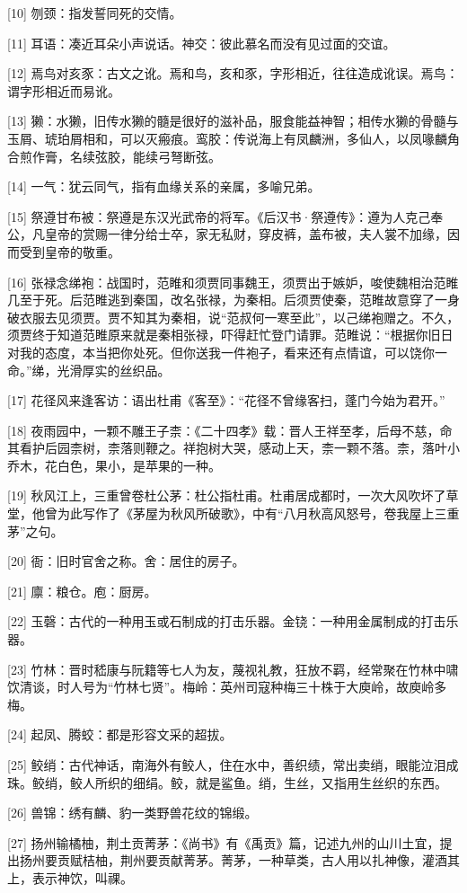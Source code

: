 \documentclass[12pt,UTF8]{ctexbook}
\begin{document}
[10] 刎颈：指发誓同死的交情。

[11] 耳语：凑近耳朵小声说话。神交：彼此慕名而没有见过面的交谊。

[12] 焉鸟对亥豕：古文之讹。焉和鸟，亥和豕，字形相近，往往造成讹误。焉鸟：谓字形相近而易讹。

[13] 獭：水獭，旧传水獭的髓是很好的滋补品，服食能益神智；相传水獭的骨髓与玉屑、琥珀屑相和，可以灭瘢痕。鸾胶：传说海上有凤麟洲，多仙人，以凤喙麟角合煎作膏，名续弦胶，能续弓弩断弦。

[14] 一气：犹云同气，指有血缘关系的亲属，多喻兄弟。

[15] 祭遵甘布被：祭遵是东汉光武帝的将军。《后汉书·祭遵传》：遵为人克己奉公，凡皇帝的赏赐一律分给士卒，家无私财，穿皮裤，盖布被，夫人裳不加缘，因而受到皇帝的敬重。

[16] 张禄念绨袍：战国时，范睢和须贾同事魏王，须贾出于嫉妒，唆使魏相治范睢几至于死。后范睢逃到秦国，改名张禄，为秦相。后须贾使秦，范睢故意穿了一身破衣服去见须贾。贾不知其为秦相，说“范叔何一寒至此”，以己绨袍赠之。不久，须贾终于知道范睢原来就是秦相张禄，吓得赶忙登门请罪。范睢说：“根据你旧日对我的态度，本当把你处死。但你送我一件袍子，看来还有点情谊，可以饶你一命。”绨，光滑厚实的丝织品。

[17] 花径风来逢客访：语出杜甫《客至》：“花径不曾缘客扫，蓬门今始为君开。”

[18] 夜雨园中，一颗不雕王子柰：《二十四孝》载：晋人王祥至孝，后母不慈，命其看护后园柰树，柰落则鞭之。祥抱树大哭，感动上天，柰一颗不落。柰，落叶小乔木，花白色，果小，是苹果的一种。

[19] 秋风江上，三重曾卷杜公茅：杜公指杜甫。杜甫居成都时，一次大风吹坏了草堂，他曾为此写作了《茅屋为秋风所破歌》，中有“八月秋高风怒号，卷我屋上三重茅”之句。

[20] 衙：旧时官舍之称。舍：居住的房子。

[21] 廪：粮仓。庖：厨房。

[22] 玉磬：古代的一种用玉或石制成的打击乐器。金铙：一种用金属制成的打击乐器。

[23] 竹林：晋时嵇康与阮籍等七人为友，蔑视礼教，狂放不羁，经常聚在竹林中啸饮清谈，时人号为“竹林七贤”。梅岭：英州司寇种梅三十株于大庾岭，故庾岭多梅。

[24] 起凤、腾蛟：都是形容文采的超拔。

[25] 鲛绡：古代神话，南海外有鲛人，住在水中，善织绩，常出卖绡，眼能泣泪成珠。鲛绡，鲛人所织的细绢。鲛，就是鲨鱼。绡，生丝，又指用生丝织的东西。

[26] 兽锦：绣有麟、豹一类野兽花纹的锦缎。

[27] 扬州输橘柚，荆土贡菁茅：《尚书》有《禹贡》篇，记述九州的山川土宜，提出扬州要贡赋桔柚，荆州要贡献菁茅。菁茅，一种草类，古人用以扎神像，灌酒其上，表示神饮，叫祼。
\end{document}
